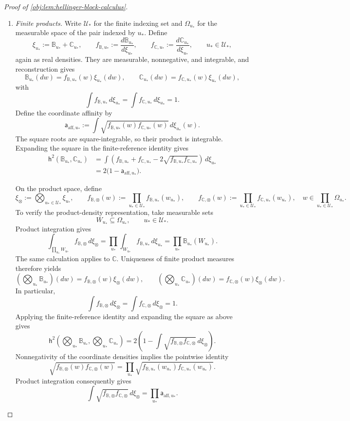 \begin{proof}[Proof of \cref{obj:lem:hellinger-block-calculus}]
\begin{enumerate}
\item \emph{Finite products.}
Write \(\mathcal U_*\) for the finite indexing set and \(\Omega_{u_*}\) for the measurable space of the pair indexed by \(u_*\). Define
\[
\xi_{u_*}:=\mathbb B_{u_*}+\mathbb C_{u_*},
\qquad
f_{\mathbb B,u_*}:=\frac{d\mathbb B_{u_*}}{d\xi_{u_*}},
\qquad
f_{\mathbb C,u_*}:=\frac{d\mathbb C_{u_*}}{d\xi_{u_*}},
\qquad u_*\in\mathcal U_*,
\]
again as real densities. They are measurable, nonnegative, and integrable, and reconstruction gives
\[
\mathbb B_{u_*}(dw)
   =f_{\mathbb B,u_*}(w)\xi_{u_*}(dw),
\qquad
\mathbb C_{u_*}(dw)
   =f_{\mathbb C,u_*}(w)\xi_{u_*}(dw),
\]
with
\[
\int f_{\mathbb B,u_*}\,d\xi_{u_*}
=
\int f_{\mathbb C,u_*}\,d\xi_{u_*}
=1.
\]
Define the coordinate affinity by
\[
\mathsf a_{\mathrm{aff},u_*}
:=
\int
\sqrt{f_{\mathbb B,u_*}(w)f_{\mathbb C,u_*}(w)}
\,d\xi_{u_*}(w).
\]
The square roots are square-integrable, so their product is integrable. Expanding the square in the finite-reference identity gives
\[
\begin{aligned}
\mathsf h^2(\mathbb B_{u_*},\mathbb C_{u_*})
&=\int
 \left(
 f_{\mathbb B,u_*}+f_{\mathbb C,u_*}
 -2\sqrt{f_{\mathbb B,u_*}f_{\mathbb C,u_*}}
 \right)\,d\xi_{u_*}\\
&=2\bigl(1-\mathsf a_{\mathrm{aff},u_*}\bigr).
\end{aligned}
\]

On the product space, define
\[
\xi_{\otimes}:=\bigotimes_{u_*\in\mathcal U_*}\xi_{u_*},
\qquad
f_{\mathbb B,\otimes}(w)
   :=\prod_{u_*\in\mathcal U_*}f_{\mathbb B,u_*}(w_{u_*}),
\qquad
f_{\mathbb C,\otimes}(w)
   :=\prod_{u_*\in\mathcal U_*}f_{\mathbb C,u_*}(w_{u_*}),
\quad
w\in\prod_{u_*\in\mathcal U_*}\Omega_{u_*}.
\]
To verify the product-density representation, take measurable sets
\[
W_{u_*}\subseteq\Omega_{u_*},
\qquad u_*\in\mathcal U_*.
\]
Product integration gives
\[
\int_{\prod_{u_*}W_{u_*}}
 f_{\mathbb B,\otimes}\,d\xi_{\otimes}
=
\prod_{u_*}
 \int_{W_{u_*}}f_{\mathbb B,u_*}\,d\xi_{u_*}
=
\prod_{u_*}\mathbb B_{u_*}(W_{u_*}).
\]
The same calculation applies to \(\mathbb C\). Uniqueness of finite product measures therefore yields
\[
\left(\bigotimes_{u_*}\mathbb B_{u_*}\right)(dw)
   =f_{\mathbb B,\otimes}(w)\xi_{\otimes}(dw),
\qquad
\left(\bigotimes_{u_*}\mathbb C_{u_*}\right)(dw)
   =f_{\mathbb C,\otimes}(w)\xi_{\otimes}(dw).
\]
In particular,
\[
\int f_{\mathbb B,\otimes}\,d\xi_{\otimes}
=
\int f_{\mathbb C,\otimes}\,d\xi_{\otimes}
=1.
\]
Applying the finite-reference identity and expanding the square as above gives
\[
\mathsf h^2\left(\bigotimes_{u_*}\mathbb B_{u_*},
                \bigotimes_{u_*}\mathbb C_{u_*}\right)
=
2\left(
1-\int\sqrt{f_{\mathbb B,\otimes}f_{\mathbb C,\otimes}}
\,d\xi_{\otimes}
\right).
\]
Nonnegativity of the coordinate densities implies the pointwise identity
\[
\sqrt{f_{\mathbb B,\otimes}(w)f_{\mathbb C,\otimes}(w)}
=
\prod_{u_*}
\sqrt{f_{\mathbb B,u_*}(w_{u_*})
      f_{\mathbb C,u_*}(w_{u_*})}.
\]
Product integration consequently gives
\[
\int\sqrt{f_{\mathbb B,\otimes}f_{\mathbb C,\otimes}}
\,d\xi_{\otimes}
=
\prod_{u_*}\mathsf a_{\mathrm{aff},u_*}.
\]


\end{enumerate}
\end{proof}
